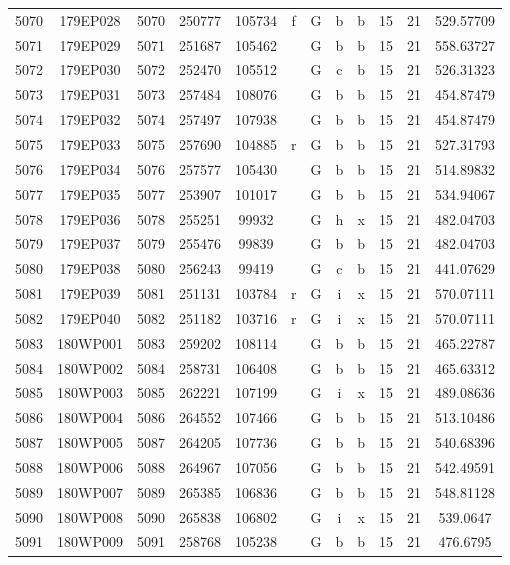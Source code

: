\begin{tabular}{|*{12}{c|}}
5070 & 179EP028 & 5070 & 250777 & 105734 & f & G & b & b & 15 & 21 & 529.57709 \\ 
5071 & 179EP029 & 5071 & 251687 & 105462 &  & G & b & b & 15 & 21 & 558.63727 \\ 
5072 & 179EP030 & 5072 & 252470 & 105512 &  & G & c & b & 15 & 21 & 526.31323 \\ 
5073 & 179EP031 & 5073 & 257484 & 108076 &  & G & b & b & 15 & 21 & 454.87479 \\ 
5074 & 179EP032 & 5074 & 257497 & 107938 &  & G & b & b & 15 & 21 & 454.87479 \\ 
5075 & 179EP033 & 5075 & 257690 & 104885 & r & G & b & b & 15 & 21 & 527.31793 \\ 
5076 & 179EP034 & 5076 & 257577 & 105430 &  & G & b & b & 15 & 21 & 514.89832 \\ 
5077 & 179EP035 & 5077 & 253907 & 101017 &  & G & b & b & 15 & 21 & 534.94067 \\ 
5078 & 179EP036 & 5078 & 255251 & 99932 &  & G & h & x & 15 & 21 & 482.04703 \\ 
5079 & 179EP037 & 5079 & 255476 & 99839 &  & G & b & b & 15 & 21 & 482.04703 \\ 
5080 & 179EP038 & 5080 & 256243 & 99419 &  & G & c & b & 15 & 21 & 441.07629 \\ 
5081 & 179EP039 & 5081 & 251131 & 103784 & r & G & i & x & 15 & 21 & 570.07111 \\ 
5082 & 179EP040 & 5082 & 251182 & 103716 & r & G & i & x & 15 & 21 & 570.07111 \\ 
5083 & 180WP001 & 5083 & 259202 & 108114 &  & G & b & b & 15 & 21 & 465.22787 \\ 
5084 & 180WP002 & 5084 & 258731 & 106408 &  & G & b & b & 15 & 21 & 465.63312 \\ 
5085 & 180WP003 & 5085 & 262221 & 107199 &  & G & i & x & 15 & 21 & 489.08636 \\ 
5086 & 180WP004 & 5086 & 264552 & 107466 &  & G & b & b & 15 & 21 & 513.10486 \\ 
5087 & 180WP005 & 5087 & 264205 & 107736 &  & G & b & b & 15 & 21 & 540.68396 \\ 
5088 & 180WP006 & 5088 & 264967 & 107056 &  & G & b & b & 15 & 21 & 542.49591 \\ 
5089 & 180WP007 & 5089 & 265385 & 106836 &  & G & b & b & 15 & 21 & 548.81128 \\ 
5090 & 180WP008 & 5090 & 265838 & 106802 &  & G & i & x & 15 & 21 & 539.0647 \\ 
5091 & 180WP009 & 5091 & 258768 & 105238 &  & G & b & b & 15 & 21 & 476.6795 \\ 

\end{tabular}
